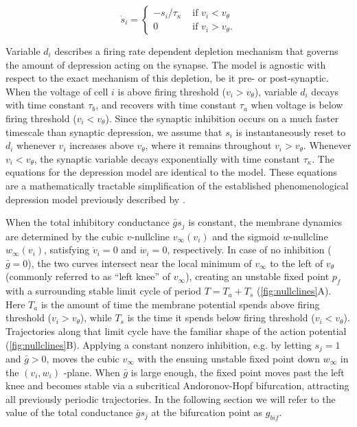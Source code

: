 \begin{equation}
	\label{eq:dot-s}
	\dot s_{i} = \begin{cases}
		-s_{i} / \tau_{\kappa} & \text{ if } v_{i}<v_{\theta}  \\
		0                      & \text{ if } v_{i}>v_{\theta}.
	\end{cases}
\end{equation}

Variable $d_{i}$ describes a firing rate dependent depletion mechanism that governs the amount of depression acting on the synapse.
The model is agnostic with respect to the exact mechanism of this depletion, be it pre- or post-synaptic.
When the voltage of cell $i$ is above firing threshold ($v_i>v_\theta$), variable $d_i$ decays with time constant $\tau_b$, and recovers with time constant $\tau_a$ when voltage is below firing threshold ($v_i < v_\theta$).
Since the synaptic inhibition occurs on a much faster timescale than synaptic depression, we assume that $s_i$ is instantaneously reset to $d_i$ whenever $v_i$ increases above $v_\theta$, where it remains throughout $v_i > v_\theta$.
Whenever $v_i < v_\theta$, the synaptic variable decays exponentially with time constant $\tau_\kappa$.
The equations for the depression model are identical to the \citet{bose2001} model.
These equations are a mathematically tractable simplification of the established phenomenological depression model previously described by \citet{tsodyks1997}.

When the total inhibitory conductance $\bar g s_{j}$ is constant, the membrane dynamics are determined by the cubic $v$-nullcline $v_{\infty}(v_i)$ and the sigmoid $w$-nullcline $w_{\infty}(v_{i})$, satisfying $\dot v_{i}=0$ and $\dot w_{i}=0$, respectively.
In case of no inhibition ($\bar g=0$), the two curves intersect near the local minimum of $v_{\infty}$ to the left of $v_{\theta}$ (commonly referred to as ``left knee'' of $v_{\infty}$), creating an unstable fixed point $p_{f}$ with a surrounding stable limit cycle of period $T=T_{a}+T_{s}$ (\cref{fig:nullclines}A).
Here $T_{a}$ is the amount of time the membrane potential spends above firing threshold ($v_{i}>v_\theta$), while $T_{s}$ is the time it spends below firing threshold ($v_{i}<v_\theta$). Trajectories along that limit cycle have the familiar shape of the action potential (\cref{fig:nullclines}B).
Applying a constant nonzero inhibition, e.g. by letting $s_{j}=1$ and $\bar g > 0$, moves the cubic $v_{\infty}$ with the ensuing unstable fixed point down $w_{\infty}$ in the $(v_{i}, w_{i})$ -plane.
When $\bar g$ is large enough, the fixed point moves past the left knee and becomes stable via a subcritical Andoronov-Hopf bifurcation, attracting all previously periodic trajectories.
In the following section we will refer to the value of the total conductance $\bar g s_{j}$ at the bifurcation point as $g_{bif}$.

